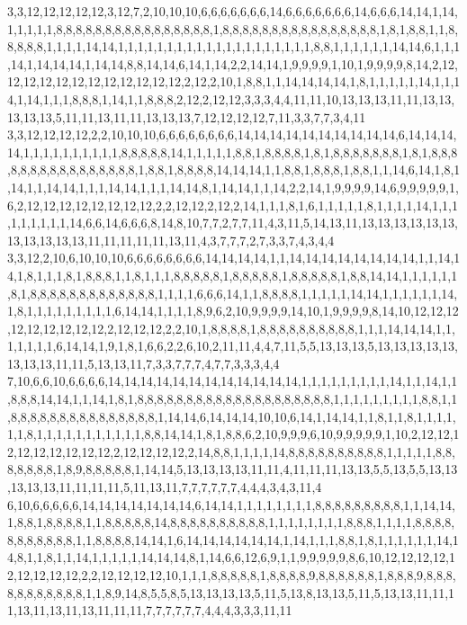 3,3,12,12,12,12,12,3,12,7,2,10,10,10,6,6,6,6,6,6,6,14,6,6,6,6,6,6,6,14,6,6,6,14,14,1,14,1,1,1,1,1,8,8,8,8,8,8,8,8,8,8,8,8,8,8,8,8,1,8,8,8,8,8,8,8,8,8,8,8,8,8,8,8,8,1,8,1,8,8,1,1,8,8,8,8,8,1,1,1,1,14,14,1,1,1,1,1,1,1,1,1,1,1,1,1,1,1,1,1,1,1,1,8,8,1,1,1,1,1,1,14,14,6,1,1,1,14,1,14,14,14,1,14,14,8,8,14,14,6,14,1,14,2,2,14,14,1,9,9,9,9,1,10,1,9,9,9,9,8,14,2,12,12,12,12,12,12,12,12,12,12,12,12,2,12,2,10,1,8,8,1,1,14,14,14,14,1,8,1,1,1,1,1,14,1,1,14,1,14,1,1,1,8,8,8,1,14,1,1,8,8,8,2,12,2,12,12,3,3,3,4,4,11,11,10,13,13,13,11,11,13,13,13,13,13,5,11,11,13,11,11,13,13,13,7,12,12,12,12,7,11,3,3,7,7,3,4,11
3,3,12,12,12,12,2,2,10,10,10,6,6,6,6,6,6,6,6,14,14,14,14,14,14,14,14,14,14,6,14,14,14,14,1,1,1,1,1,1,1,1,1,1,8,8,8,8,8,14,1,1,1,1,1,8,8,1,8,8,8,8,1,8,1,8,8,8,8,8,8,8,1,8,1,8,8,8,8,8,8,8,8,8,8,8,8,8,8,8,8,1,8,8,1,8,8,8,8,14,14,14,1,1,8,8,1,8,8,8,1,8,8,1,1,14,6,14,1,8,1,14,1,1,14,14,1,1,1,14,14,1,1,1,14,14,8,1,14,14,1,1,14,2,2,14,1,9,9,9,9,14,6,9,9,9,9,9,1,6,2,12,12,12,12,12,12,12,12,2,2,12,12,2,12,2,14,1,1,1,8,1,6,1,1,1,1,1,8,1,1,1,1,14,1,1,1,1,1,1,1,1,1,14,6,6,14,6,6,6,8,14,8,10,7,7,2,7,7,11,4,3,11,5,14,13,11,13,13,13,13,13,13,13,13,13,13,13,11,11,11,11,11,13,11,4,3,7,7,7,2,7,3,3,7,4,3,4,4
3,3,12,2,10,6,10,10,10,6,6,6,6,6,6,6,6,14,14,14,14,1,1,14,14,14,14,14,14,14,14,1,1,14,14,1,8,1,1,1,8,1,8,8,8,1,1,8,1,1,1,8,8,8,8,8,1,8,8,8,8,8,1,8,8,8,8,8,1,8,8,14,14,1,1,1,1,1,1,8,1,8,8,8,8,8,8,8,8,8,8,8,8,8,1,1,1,1,6,6,6,14,1,1,8,8,8,8,1,1,1,1,1,14,14,1,1,1,1,1,1,14,1,8,1,1,1,1,1,1,1,1,1,6,14,14,1,1,1,1,8,9,6,2,10,9,9,9,9,14,10,1,9,9,9,9,8,14,10,12,12,12,12,12,12,12,12,12,2,12,12,12,2,2,10,1,8,8,8,8,1,8,8,8,8,8,8,8,8,8,8,1,1,1,14,14,14,1,1,1,1,1,1,1,6,14,14,1,9,1,8,1,6,6,2,2,6,10,2,11,11,4,4,7,11,5,5,13,13,13,5,13,13,13,13,13,13,13,13,11,11,5,13,13,11,7,3,3,7,7,7,4,7,7,3,3,3,4,4
7,10,6,6,10,6,6,6,6,14,14,14,14,14,14,14,14,14,14,14,14,1,1,1,1,1,1,1,1,1,14,1,1,14,1,1,8,8,8,14,14,1,1,14,1,8,1,8,8,8,8,8,8,8,8,8,8,8,8,8,8,8,8,8,8,8,8,1,1,1,1,1,1,1,1,1,8,8,1,1,8,8,8,8,8,8,8,8,8,8,8,8,8,8,8,1,14,14,6,14,14,14,10,10,6,14,1,14,14,1,1,8,1,1,8,1,1,1,1,1,1,8,1,1,1,1,1,1,1,1,1,1,1,8,8,14,14,1,8,1,8,8,6,2,10,9,9,9,6,10,9,9,9,9,9,1,10,2,12,12,12,12,12,12,12,12,12,2,12,12,12,12,2,14,8,8,1,1,1,1,14,8,8,8,8,8,8,8,8,8,8,1,1,1,1,1,8,8,8,8,8,8,8,1,8,9,8,8,8,8,8,1,14,14,5,13,13,13,13,11,11,4,11,11,11,13,13,5,5,13,5,5,13,13,13,13,13,11,11,11,11,5,11,13,11,7,7,7,7,7,7,4,4,4,3,4,3,11,4
6,10,6,6,6,6,6,14,14,14,14,14,14,14,6,14,14,1,1,1,1,1,1,1,1,8,8,8,8,8,8,8,8,8,1,1,14,14,1,8,8,1,8,8,8,8,1,1,8,8,8,8,8,14,8,8,8,8,8,8,8,8,8,8,1,1,1,1,1,1,1,1,8,8,8,1,1,1,1,8,8,8,8,8,8,8,8,8,8,8,1,1,8,8,8,8,14,14,1,6,14,14,14,14,14,14,1,14,1,1,1,8,8,1,8,1,1,1,1,1,1,14,14,8,1,1,8,1,1,14,1,1,1,1,1,14,14,14,8,1,14,6,6,12,6,9,1,1,9,9,9,9,9,8,6,10,12,12,12,12,12,12,12,12,12,2,2,12,12,12,12,10,1,1,1,8,8,8,8,8,1,8,8,8,8,9,8,8,8,8,8,8,1,8,8,8,9,8,8,8,8,8,8,8,8,8,8,8,1,1,8,9,14,8,5,5,8,5,13,13,13,13,5,11,5,13,8,13,13,5,11,5,13,13,11,11,11,13,11,13,11,13,11,11,11,7,7,7,7,7,7,4,4,4,3,3,3,11,11
